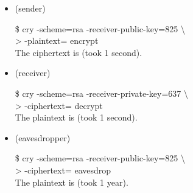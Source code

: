 \documentclass{beamer}
\title{\deliv{\pp}{Presentation}}
\begin{document}
\maketitle


\begin{frame}
\begin{itemize}
\item \alice{} (sender)
  \begin{codes}
  \$ cry -scheme=rsa -receiver-public-key=825 \textbackslash \\
  > -plaintext=\plaintext{} encrypt \\
  The ciphertext is \ciphertext{} (took 1 second).
  \end{codes}
\item \bob{} (receiver)
  \begin{codes}
  \$ cry -scheme=rsa -receiver-private-key=637 \textbackslash \\
  > -ciphertext=\ciphertext{} decrypt \\
  The plaintext is \plaintext{} (took 1 second).
  \end{codes}
\item \eve{} (eavesdropper)
  \begin{codes}
  \$ cry -scheme=rsa -receiver-public-key=825 \textbackslash \\
  > -ciphertext=\ciphertext{} eavesdrop \\
  The plaintext is \plaintext{} (took 1 year).
  \end{codes}
\end{itemize}
\end{frame}

\end{document}

